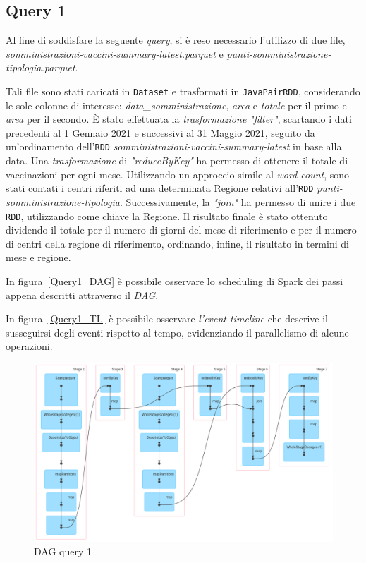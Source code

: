 \documentclass[conference]{IEEEtran}
\begin{document}
\subsection*{\textbf{Query 1}}
Al fine di soddisfare la seguente \emph{query}, si \`{e} reso necessario l'utilizzo di due file, \textit{somministrazioni-vaccini-summary-latest.parquet} e \textit{punti-somministrazione-tipologia.parquet}. \par
Tali file sono stati caricati in \texttt{Dataset} e trasformati in \texttt{JavaPairRDD}, considerando le sole colonne di interesse: \emph{data\_somministrazione}, \emph{area} e \emph{totale} per il primo e \emph{area} per il secondo. \`{E} stato effettuata la \emph{trasformazione} \emph{"filter"}, scartando i dati precedenti al 1 Gennaio 2021 e successivi al 31 Maggio 2021, seguito da un'ordinamento dell'\texttt{RDD} \textit{somministrazioni-vaccini-summary-latest} in base alla data. Una \emph{trasformazione} di \emph{"reduceByKey"} ha permesso di ottenere il totale di vaccinazioni per ogni mese. Utilizzando un approccio simile al \emph{word count}, sono stati contati i centri riferiti ad una determinata Regione relativi all'\texttt{RDD} \textit{punti-somministrazione-tipologia}. Successivamente, la \emph{"join"} ha permesso di unire i due \texttt{RDD}, utilizzando come chiave la Regione. Il risultato finale \`{e} stato ottenuto dividendo il totale per il numero di giorni del mese di riferimento e per il numero di centri della regione di riferimento, ordinando, infine, il risultato in termini di mese e regione.
\par In figura~\ref{Query1_DAG} \`{e} possibile osservare lo scheduling di Spark dei passi appena descritti attraverso il \emph{DAG}.\par In figura~\ref{Query1_TL} \`{e} possibile osservare \emph{l'event timeline} che descrive il susseguirsi degli eventi rispetto al tempo, evidenziando il parallelismo di alcune operazioni. 
\begin{figure}[htbp]
\includegraphics[scale=0.20]{Screenshot/Query1_DAG.png}
\caption{DAG query 1}\label{Query1_DAG}
\label{fig}
\end{figure}
\end{document}
